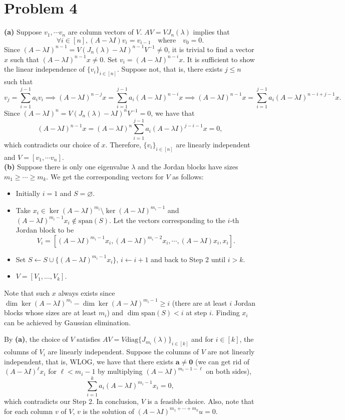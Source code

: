 \documentclass[11pt]{article}
\theoremstyle{plain}
\theoremstyle{definition}
\theoremstyle{remark}
\newcommand{\diag}{\mathrm{diag}}
\renewcommand{\emptyset}{\varnothing}
\def\*#1{\boldsymbol{#1}} %
\def\-#1{\mathrm{#1}} %
\begin{document}
\section*{Problem 4}
\textbf{(a)}
Suppose $v_1,\cdots v_n$ are column vectors of $V$.
$A V =V J_n(\lambda)$ implies that 
$$
    \forall i\in[n], (A - \lambda I)v_i = v_{i-1} \quad \text{where} \quad v_0 = 0.
$$
Since $(A - \lambda I)^{n-1} = V (J_n(\lambda) - \lambda I)^{n-1}V^{-1}\neq 0$, it is trivial to find a vector $x$ such that $(A - \lambda I)^{n-1}x \neq 0$.
Set $v_i = (A-\lambda I)^{n-i}x$.
It is sufficient to show the linear independence of $\{v_i\}_{i\in[n]}$.
Suppose not, that is, there exists $j \leq n$ such that
$$
    v_j = \sum_{i=1}^{j-1} a_i v_i \implies (A-\lambda I)^{n-j}x = \sum_{i=1}^{j-1}a_i (A-\lambda I)^{n-i}x
    \implies (A-\lambda I)^{n-1}x = \sum_{i=1}^{j-1}a_i (A-\lambda I)^{n-i+j-1}x.
$$
Since $(A - \lambda I)^{n} = V (J_n(\lambda) - \lambda I)^nV^{-1} = 0$, we have that
$$
    (A - \lambda I)^{n-1}x = (A-\lambda I)^n\sum_{i=1}^{j-1}a_i (A-\lambda I)^{j-i-1}x = 0,
$$
which contradicts our choice of $x$. 
Therefore, $\{v_i\}_{i\in[n]}$ are linearly independent and $V = [v_1,\cdots v_n]$.
\\\textbf{(b)}
Suppose there is only one eigenvalue $\lambda$ and the Jordan blocks have sizes $m_1 \geq \cdots \geq m_k$.
We get the corresponding vectors for $V$ as follows:
\begin{itemize}
    \item [1.] Initially $i=1$ and $S = \emptyset$.
    \item [2.] Take $x_i\in \ker (A-\lambda I)^{m_i}\setminus \ker (A-\lambda I)^{m_i-1}$ and $(A - \lambda I)^{m_i-1}x_i \notin \-{span}(S)$.
    Let the vectors corresponding to the $i$-th Jordan block to be 
    $$
        V_i =  [(A - \lambda I)^{m_i-1}x_i, (A - \lambda I)^{m_i-2}x_i,\cdots,(A - \lambda I)x_i,x_i].
    $$
    \item [3.] Set $S \leftarrow S \cup \{(A - \lambda I)^{m_i-1}x_i\}$, $i\leftarrow i+1$ and back to Step 2 until $i > k$.
    \item [4.] $V = [V_1,\ldots,V_k]$.
\end{itemize}
Note that such $x$ always exists since $\dim \ker(A-\lambda I)^{m_i} - \dim \ker(A-\lambda I)^{m_i-1} \geq i$ (there are at least $i$ Jordan blocks whose sizes are at least $m_i$) and $\dim\-{span} (S) < i$ at step $i$.
Finding $x_i$ can be achieved by Gaussian elimination.


By \textbf{(a)}, the choice of $V$ satisfies $AV = V \diag\{J_{m_i}(\lambda)\}_{i\in[k]}$ and for $i\in [k]$, the columns of $V_i$ are linearly independent. 
Suppose the columns of $V$ are not linearly independent, that is, WLOG, we have that there exists $\*a\neq \*0$ (we can get rid of $(A-\lambda I)^{\ell}x_i$ for $\ell < m_i-1$ by multiplying $(A-\lambda I)^{m_i-1-\ell}$ on both sides),
$$
    \sum_{i=1}^k a_i (A-\lambda I)^{m_i - 1} x_i = 0,
$$
which contradicts our Step 2.
In conclusion, $V$ is a feasible choice.
Also, note that for each column $v$ of $V$, $v$ is the solution of $(A-\lambda I)^{m_1+\cdots+m_k} u = 0$.
\end{document}
